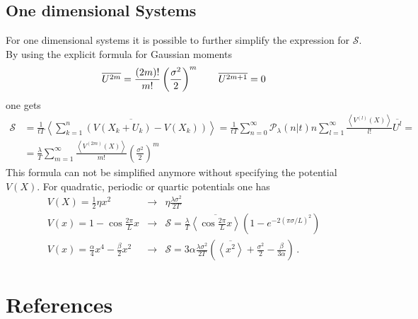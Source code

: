 \documentclass[12pt]{iopart}
\newcommand{\lx} {\left}
\newcommand{\rx} {\right}
\newcommand{\ave}[1] {\lx\langle #1 \rx\rangle}
\newcommand{\cP} {\mathcal{P}}
\newcommand{\cS} {\mathcal{S}}
\begin{document}
\subsection{One dimensional Systems}
For one dimensional systems it is possible to further simplify the expression for $\cS$. By using the explicit formula for Gaussian moments
\begin{equation}
\overline{U^{2m}} = \frac{\lx(2m\rx)!}{m!}\lx(\frac{\sigma^2}{2}\rx)^m \qquad \overline{U^{2m+1}} = 0 \\
\end{equation}
one gets
\begin{align}
\cS &= \frac{1}{tT}\overline{\ave{\sum_{k=1}^n \lx(V(X_k+U_k)-V(X_k)\rx)}} = \frac{1}{tT} \sum_{n=0}^\infty \cP_\lambda(n|t) n \sum_{l=1}^\infty \frac{\ave{V^{(l)}(X)}}{l!}\overline{U^{l}} = \nonumber \\
&=\frac{\lambda}{T}\sum_{m=1}^\infty \frac{\ave{V^{(2m)}(X)}}{m!}\lx(\frac{\sigma^2}{2}\rx)^m
\end{align}
This formula can not be simplified anymore without specifying the potential $V(X)$. For quadratic, periodic or quartic potentials one has
\begin{eqnarray}
    V(X)=\frac{1}{2}\eta x^2 &\rightarrow& \eta\frac{\lambda\sigma^2}{2T}\\
    V(x)=1-\cos{\frac{2\pi}{L}x} &\rightarrow& \cS = \frac{\lambda}{T}\overline{\ave{\cos{\frac{2\pi}{L}x}}} \lx(1-e^{-2\lx(\pi \sigma/L\rx)^2}\rx) \\
    V(x)= \frac{\alpha}{4} x^4-\frac{\beta}{2} x^2 &\rightarrow& \cS = 3\alpha\frac{\lambda\sigma^2}{2T} \lx(\overline{\ave{x^2}}+\frac{\sigma^2}{2}-\frac{\beta}{3\alpha} \rx)\,.
\end{eqnarray}
\section*{References}


\end{document}
